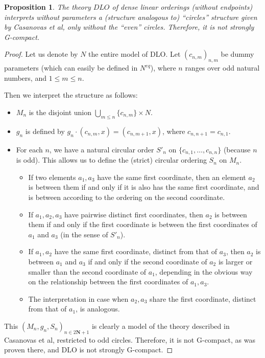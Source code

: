 \documentclass[final,a4paper,12pt]{amsart}
\newcommand{\bN}{{\mathbf{N}}}
\newtheorem{prop}[thm]{Proposition}
\theoremstyle{remark}
\theoremstyle{definition}
\begin{document}
	\begin{prop}
		The theory $DLO$ of dense linear orderings (without endpoints) interprets without parameters a (structure analogous to) ``circles'' structure given by Casanovas et al, only without the ``even'' circles. Therefore, it is not strongly G-compact.
	\end{prop}
	\begin{proof}
		Let us denote by $N$ the entire model of DLO. Let $(c_{n,m})_{n,m}$ be dummy parameters (which can easily be defined in $N^{eq}$), where $n$ ranges over odd natural numbers, and $1\leq m\leq n$.
		
		Then we interpret the structure as follows:
		\begin{itemize}
			\item
			$M_n$ is the disjoint union $\bigcup_{m\leq n} \{c_{n,m}\}\times N$.
			\item
			$g_n$ is defined by $g_n\cdot (c_{n,m},x)=(c_{n,m+1},x)$, where $c_{n,n+1}=c_{n,1}$.
			\item
			For each $n$, we have a natural circular order $S'_n$ on $\{c_{n,1},\ldots,c_{n,n}\}$ (because $n$ is odd). This allows us to define the (strict) circular ordering $S_n$ on $M_n$.
			\begin{itemize}
				\item
				If two elements $a_1,a_3$ have the same first coordinate, then an element $a_2$ is between them if and only if it is also has the same first coordinate, and is between according to the ordering on the second coordinate. 
				\item
				If $a_1, a_2, a_3$ have pairwise distinct first coordinates, then $a_2$ is between them if and only if the first coordinate is between the first coordinates of $a_1$ and $a_3$ (in the sense of $S'_n$).
				\item
				If $a_1, a_2$ have the same first coordinate, distinct from that of $a_3$, then $a_2$ is between $a_1$ and $a_3$ if and only if the second coordinate of $a_2$ is larger or smaller than the second coordinate of $a_1$, depending in the obvious way on the relationship between the first coordinates of $a_1,a_3$.
				\item
				The interpretation in case when $a_2,a_3$ share the first coordinate, distinct from that of $a_1$, is analogous.
			\end{itemize}
		\end{itemize}
		This $(M_n,g_n,S_n)_{n\in 2{\bN}+1}$ is clearly a model of the theory described in Casanovas et al, restricted to odd circles. Therefore, it is not G-compact, as was proven there, and DLO is not strongly G-compact.
	\end{proof}
	
\end{document}
